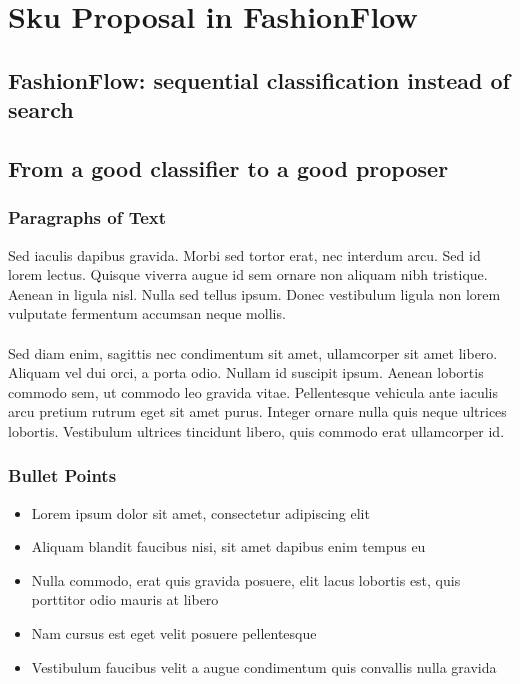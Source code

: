 \documentclass{beamer}
\begin{document}
\section{Sku Proposal in FashionFlow}
\subsection{FashionFlow: sequential classification instead of search}
\subsection{From a good classifier to a good proposer}


\begin{frame}
\frametitle{Paragraphs of Text}
Sed iaculis dapibus gravida. Morbi sed tortor erat, nec interdum arcu. Sed id lorem lectus. Quisque viverra augue id sem ornare non aliquam nibh tristique. Aenean in ligula nisl. Nulla sed tellus ipsum. Donec vestibulum ligula non lorem vulputate fermentum accumsan neque mollis.\\~\\

Sed diam enim, sagittis nec condimentum sit amet, ullamcorper sit amet libero. Aliquam vel dui orci, a porta odio. Nullam id suscipit ipsum. Aenean lobortis commodo sem, ut commodo leo gravida vitae. Pellentesque vehicula ante iaculis arcu pretium rutrum eget sit amet purus. Integer ornare nulla quis neque ultrices lobortis. Vestibulum ultrices tincidunt libero, quis commodo erat ullamcorper id.
\end{frame}


\begin{frame}
\frametitle{Bullet Points}
\begin{itemize}
\item Lorem ipsum dolor sit amet, consectetur adipiscing elit
\item Aliquam blandit faucibus nisi, sit amet dapibus enim tempus eu
\item Nulla commodo, erat quis gravida posuere, elit lacus lobortis est, quis porttitor odio mauris at libero
\item Nam cursus est eget velit posuere pellentesque
\item Vestibulum faucibus velit a augue condimentum quis convallis nulla gravida
\end{itemize}
\end{frame}
\end{document}
